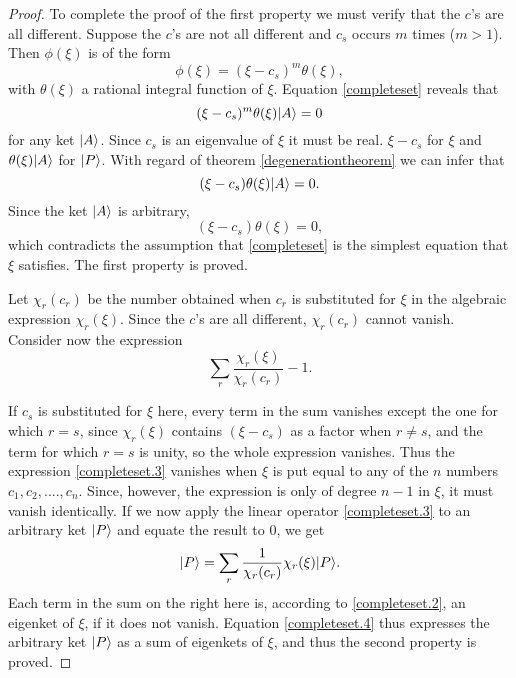\begin{proof}
To complete the proof of the first property we must verify that the $c$'s are all different. Suppose the $c$'s are not all different and $c_s$ occurs $m$ times ($m>1$). Then $\phi(\xi)$ is of the form
\begin{equation*}
\phi(\xi) = (\xi - c_s) ^m \theta(\xi),
\end{equation*}
with $\theta(\xi)$ a rational integral function of $\xi$. Equation \ref{completeset} reveals that
\begin{equation}
(\xi - c_s) ^m \theta ( \xi ) | A \rangle = 0
\end{equation}
for any ket $| A \rangle$. Since $c_s$ is an eigenvalue of $\xi$ it must be real. $\xi - c_s$ for $\xi$ and $\theta ( \xi ) | A \rangle$ for $| P \rangle$. With regard of theorem \ref{degenerationtheorem} we can infer that
\begin{equation*}
(\xi - c_s) \theta(\xi) | A \rangle = 0.
\end{equation*}
Since the ket $| A \rangle$ is arbitrary,
\begin{equation*}
(\xi - c_s) \theta( \xi ) = 0,
\end{equation*}
which contradicts the assumption that \ref{completeset} is the simplest equation that $\xi$ satisfies. The first property is proved.

Let $\chi _r (c_r)$ be the number obtained when $c_r$ is substituted for $\xi$ in the algebraic expression $\chi_r(\xi)$. Since the $c$'s are all different, $\chi_r(c_r)$ cannot vanish. Consider now the expression
\begin{equation}
\sum_r \frac{\chi_r (\xi)}{\chi_r (c_r)} -1.
\label{completeset.3}
\end{equation}

If $c_s$ is substituted for $\xi$ here, every term in the sum vanishes except the one for which $r=s$, since $\chi_r(\xi)$ contains $(\xi - c_s)$ as a factor when $r \neq s$, and the term for which $r=s$ is unity, so the whole expression vanishes. Thus the expression \ref{completeset.3} vanishes when $\xi$ is put equal to any of the $n$ numbers $c_1,c_2,....,c_n$. Since, however, the expression is only of degree $n-1$ in $\xi$, it must vanish identically. If we now apply the linear operator \ref{completeset.3} to an arbitrary ket $| P \rangle$ and equate the result to $0$, we get
\begin{equation}
| P \rangle = \sum_r \frac{1}{\chi_r (c_r)} \chi_r(\xi) | P \rangle.
\label{completeset.4}
\end{equation}
Each term in the sum on the right here is, according to \ref{completeset.2}, an eigenket of $\xi$, if it does not vanish. Equation \ref{completeset.4} thus expresses the arbitrary ket $| P \rangle$ as a sum of eigenkets of $\xi$, and thus the second property is proved.
\end{proof}

